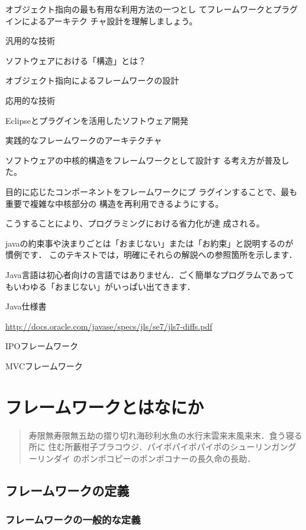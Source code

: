 \documentclass[a4j, twoside]{jsbook}
\begin{document}
オブジェクト指向の最も有用な利用方法の一つとし
てフレームワークとプラグインによるアーキテク
チャ設計を理解しましょう。 

汎用的な技術 

ソフトウェアにおける「構造」とは？ 

オブジェクト指向によるフレームワークの設計 

応用的な技術 

Eclipseとプラグインを活用したソフトウェア開発 

実践的なフレームワークのアーキテクチャ 

ソフトウェアの中核的構造をフレームワークとして設計す
る考え方が普及した。 

目的に応じたコンポーネントをフレームワークにプ
ラグインすることで、最も重要で複雑な中核部分の
構造を再利用できるようにする。 

こうすることにより、プログラミングにおける省力化が達
成される。


javaの約束事や決まりごとは「おまじない」または「お約束」と説明するのが
慣例です．
このテキストでは，明確にそれらの解説への参照箇所を示します．

Java言語は初心者向けの言語ではありません．ごく簡単なプログラムであって
もいわゆる「おまじない」がいっぱい出てきます．

Java仕様書

\url{http://docs.oracle.com/javase/specs/jls/se7/jls7-diffs.pdf}

IPOフレームワーク

MVCフレームワーク

\chapter{フレームワークとはなにか}

\begin{abstract}
寿限無寿限無五劫の摺り切れ海砂利水魚の水行末雲来末風来末．食う寝る所に
住む所藪柑子ブラコウジ．パイポパイポパイポのシューリンガングーリンダイ
のポンポコピーのポンポコナーの長久命の長助．
\end{abstract}

\section{フレームワークの定義}
\subsection{フレームワークの一般的な定義 }
\end{document}
